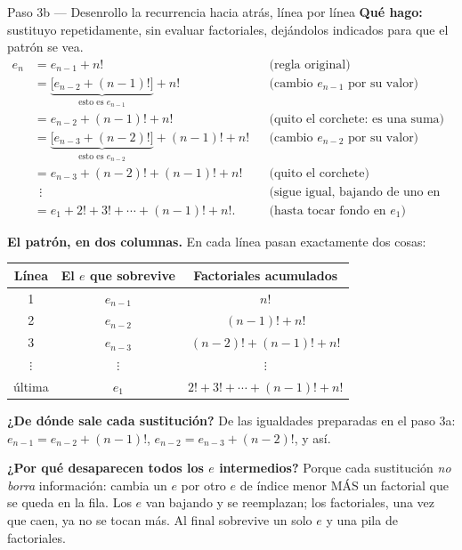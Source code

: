 \documentclass[11pt]{article}
\begin{document}
\begin{paso}{Paso 3b --- Desenrollo la recurrencia hacia atrás, línea por línea}
\textbf{Qué hago:} sustituyo repetidamente, sin evaluar factoriales, dejándolos indicados para que el patrón se vea.
\begin{align*}
e_n &= e_{n-1} + n! &&\text{(regla original)}\\[2pt]
    &= \underbrace{\bigl[e_{n-2} + (n-1)!\bigr]}_{\text{esto es } e_{n-1}} + n! &&\text{(cambio } e_{n-1}\text{ por su valor)}\\[2pt]
    &= e_{n-2} + (n-1)! + n! &&\text{(quito el corchete: es una suma)}\\[2pt]
    &= \underbrace{\bigl[e_{n-3} + (n-2)!\bigr]}_{\text{esto es } e_{n-2}} + (n-1)! + n! &&\text{(cambio } e_{n-2}\text{ por su valor)}\\[2pt]
    &= e_{n-3} + (n-2)! + (n-1)! + n! &&\text{(quito el corchete)}\\[2pt]
    &\ \ \vdots &&\text{(sigue igual, bajando de uno en uno)}\\[2pt]
    &= e_{1} + 2! + 3! + \cdots + (n-1)! + n! . &&\text{(hasta tocar fondo en } e_1\text{)}
\end{align*}

\medskip
\textbf{El patrón, en dos columnas.} En cada línea pasan exactamente dos cosas:

\begin{center}
\begin{tabular}{|c|c|c|}
\hline
\textbf{Línea} & \textbf{El $e$ que sobrevive} & \textbf{Factoriales acumulados} \\
\hline
1 & $e_{n-1}$ & $n!$ \\
2 & $e_{n-2}$ & $(n-1)!+n!$ \\
3 & $e_{n-3}$ & $(n-2)!+(n-1)!+n!$ \\
$\vdots$ & $\vdots$ & $\vdots$ \\
última & $e_{1}$ & $2!+3!+\cdots+(n-1)!+n!$ \\
\hline
\end{tabular}
\end{center}

\textbf{¿De dónde sale cada sustitución?} De las igualdades preparadas en el paso 3a: $e_{n-1}=e_{n-2}+(n-1)!$, $e_{n-2}=e_{n-3}+(n-2)!$, y así.

\textbf{¿Por qué desaparecen todos los $e$ intermedios?} Porque cada sustitución \emph{no borra} información: cambia un $e$ por otro $e$ de índice menor MÁS un factorial que se queda en la fila. Los $e$ van bajando y se reemplazan; los factoriales, una vez que caen, ya no se tocan más. Al final sobrevive un solo $e$ y una pila de factoriales.


\end{paso}
\end{document}
